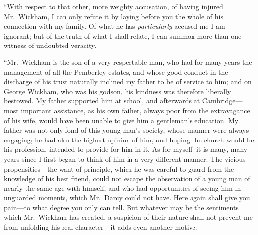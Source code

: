 ``With respect to that other, more weighty accusation, of having
injured Mr.\ Wickham, I can only refute it by laying before you
the whole of his connection with my family.  Of what he has
\emph{particularly} accused me I am ignorant; but of the truth of
what I shall relate, I can summon more than one witness of
undoubted veracity.

``Mr.\ Wickham is the son of a very respectable man, who had for
many years the management of all the Pemberley estates, and
whose good conduct in the discharge of his trust naturally
inclined my father to be of service to him; and on George
Wickham, who was his godson, his kindness was therefore
liberally bestowed.  My father supported him at school, and
afterwards at Cambridge---most important assistance, as his own
father, always poor from the extravagance of his wife, would
have been unable to give him a gentleman's education.  My
father was not only fond of this young man's society, whose
manner were always engaging; he had also the highest opinion of
him, and hoping the church would be his profession, intended to
provide for him in it.  As for myself, it is many, many years since
I first began to think of him in a very different manner.  The
vicious propensities---the want of principle, which he was careful
to guard from the knowledge of his best friend, could not escape
the observation of a young man of nearly the same age with
himself, and who had opportunities of seeing him in unguarded
moments, which Mr.\ Darcy could not have.  Here again shall
give you pain---to what degree you only can tell.  But whatever
may be the sentiments which Mr.\ Wickham has created, a
suspicion of their nature shall not prevent me from unfolding
his real character---it adds even another motive.


